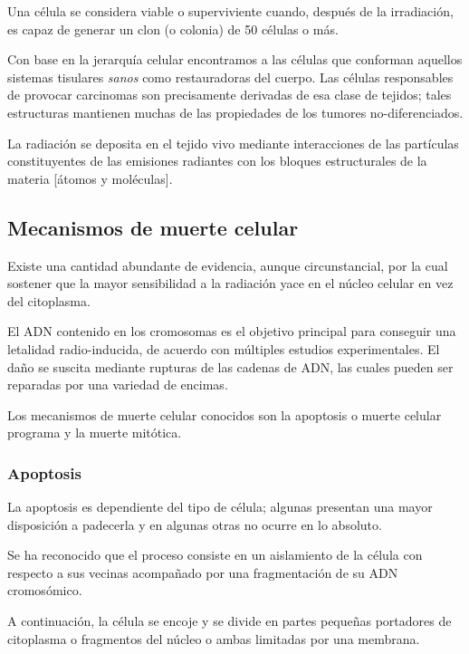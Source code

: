 \documentclass[12pt,letterpaper, oneside]{book}
\begin{document}
		Una célula se considera viable o superviviente cuando, después de la irradiación, es capaz de generar un clon (o colonia) de 50 células o más\cite{Tubiana.1990}.
		
		Con base en la jerarquía celular encontramos a las células que conforman aquellos sistemas tisulares \textit{sanos} como restauradoras del cuerpo\cite{Mayles.2007}. Las células responsables de provocar carcinomas son precisamente derivadas de esa clase de tejidos; tales estructuras mantienen muchas de las propiedades de los tumores no-diferenciados\cite{Mayles.2007}. 
		
		La radiación se deposita en el tejido vivo mediante interacciones de las partículas constituyentes de las emisiones radiantes con los bloques estructurales de la materia [átomos y moléculas]\cite{Hall.2000, Tubiana.1990, Mayles.2007}.
		
		\subsection{Mecanismos de muerte celular} 
		Existe una cantidad abundante de evidencia, aunque circunstancial, por la cual sostener que la mayor sensibilidad a la radiación yace en el núcleo celular en vez del citoplasma\cite{Bleehen.2007, Hall.2000}. 
		
		El ADN contenido en los cromosomas es el objetivo principal para conseguir una letalidad radio-inducida, de acuerdo con múltiples estudios experimentales\cite{Hall.2000, Mayles.2007}. El daño se suscita mediante rupturas de las cadenas de ADN, las cuales pueden ser reparadas por una variedad de encimas\cite{Bleehen.2007}.			
		
		Los mecanismos de muerte celular conocidos son la apoptosis o muerte celular programa y la muerte mitótica. 
		
			\subsubsection{Apoptosis}
			La apoptosis es dependiente del tipo de célula; algunas presentan una mayor disposición a padecerla y en algunas otras no ocurre en lo absoluto\cite{Hall.2000}.
			
			Se ha reconocido que el proceso consiste en un aislamiento de la célula con respecto a sus vecinas acompañado por una fragmentación de su ADN cromosómico\cite{Hall.2000}. 
			
			A continuación, la célula se encoje y se divide en partes pequeñas portadores de citoplasma o fragmentos del núcleo o ambas limitadas por una membrana\cite{Hall.2000}.
			
\end{document}
